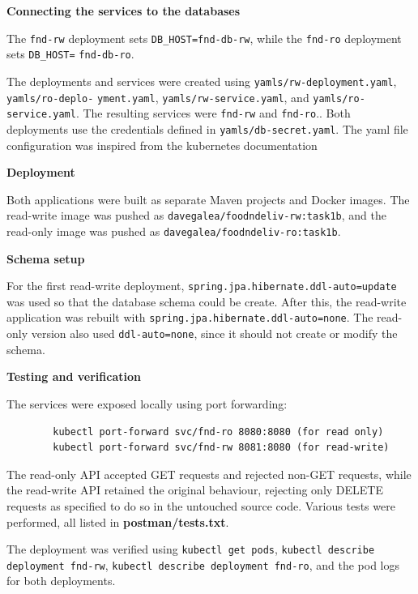 \documentclass[11pt,a4paper]{article}
\begin{document}
	\textbf{Connecting the services to the databases}
	
	The \texttt{fnd-rw} deployment sets \texttt{DB\_HOST=fnd-db-rw}, while the \texttt{fnd-ro} deployment sets \texttt{DB\_HOST=} \texttt{fnd-db-ro}.
	
	The deployments and services were created using \texttt{yamls/rw-deployment.yaml}, \texttt{yamls/ro-deplo-} \texttt{yment.yaml}, \texttt{yamls/rw-service.yaml}, and \texttt{yamls/ro-service.yaml}. The resulting services were \texttt{fnd-rw} and \texttt{fnd-ro}.. Both deployments use the credentials defined in \texttt{yamls/db-secret.yaml}. The yaml file configuration was inspired from the kubernetes documentation\cite{Connecting applications with services kubernetes} \cite{Define Environment Variables for a Container} \cite{Distribute Credentials Securely Using Secrets}

	
	\textbf{Deployment}
	
	Both applications were built as separate Maven projects and Docker images. The read-write image was pushed as \texttt{davegalea/foodndeliv-rw:task1b}, and the read-only image was pushed as \texttt{davegalea/foodndeliv-ro:task1b}.
	
	\textbf{Schema setup}
	
	For the first read-write deployment, \texttt{spring.jpa.hibernate.ddl-auto=update} was used so that  the database schema could be create. After this, the read-write application was rebuilt with \texttt{spring.jpa.hibernate.ddl-auto=none}. The read-only version also used \texttt{ddl-auto=none}, since it should not create or modify the schema.
	
	\textbf{Testing and verification}
	
	The services were exposed locally using port forwarding:
	
	\begin{verbatim}
		kubectl port-forward svc/fnd-ro 8080:8080 (for read only)
		kubectl port-forward svc/fnd-rw 8081:8080 (for read-write)
	\end{verbatim}
	
	The read-only API accepted GET requests and rejected non-GET requests, while the read-write API retained the original behaviour, rejecting only DELETE requests as specified to do so in the untouched source code. Various tests were performed, all listed in \textbf{postman/tests.txt}. 
	
	The deployment was verified using \texttt{kubectl get pods}, \texttt{kubectl describe deployment fnd-rw}, \texttt{kubectl describe deployment fnd-ro}, and the pod logs for both deployments.
	
\end{document}

